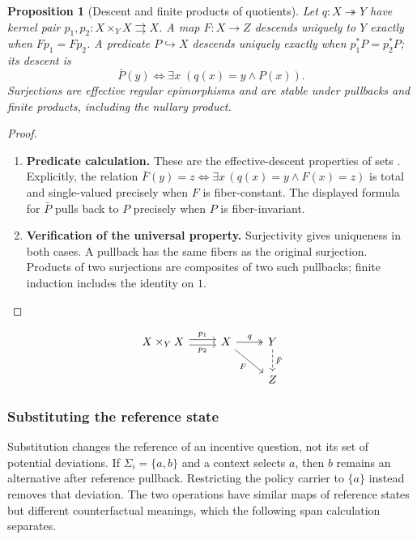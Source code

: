 \documentclass[11pt,a4paper]{article}
\numberwithin{equation}{section}
\newtheorem{proposition}[theorem]{Proposition}
\theoremstyle{definition}
\theoremstyle{remark}
\theoremstyle{plain}
\begin{document}
\begin{proposition}[Descent and finite products of quotients]
\label{prop:egt-kernel-descent}
\label{prop:egt-predicate-descent}
\label{prop:egt-finite-surjections}
Let $q:X\twoheadrightarrow Y$ have kernel pair
$p_1,p_2:X\times_YX\rightrightarrows X$.
A map $F:X\to Z$ descends uniquely to $Y$ exactly when $Fp_1=Fp_2$.
A predicate $P\hookrightarrow X$ descends uniquely exactly when
$p_1^*P=p_2^*P$; its descent is
\[
 \bar P(y)\iff\exists x\;(q(x)=y\wedge P(x)).
\]
Surjections are effective regular epimorphisms and are stable under
pullbacks and finite products, including the nullary product.
\end{proposition}
\begin{proof}
\leavevmode
\begin{enumerate}[label=\textup{(\arabic*)},leftmargin=*,itemsep=4pt,topsep=3pt]
  \item \textbf{Predicate calculation.} These are the effective-descent properties of sets
\citep[Chapters 4--5]{Jacobs1999}. Explicitly, the relation
$\bar F(y)=z\iff\exists x\,(q(x)=y\wedge F(x)=z)$ is total and
single-valued precisely when $F$ is fiber-constant. The displayed formula
for $\bar P$ pulls back to $P$ precisely when $P$ is fiber-invariant.
  \item \textbf{Verification of the universal property.} Surjectivity gives uniqueness in both cases. A pullback has the same fibers
as the original surjection. Products of two surjections are composites of
two such pullbacks; finite induction includes the identity on $1$.
\end{enumerate}
\end{proof}

\[
\begin{tikzcd}
 X\times_YX \arrow[r,shift left=.55ex,"p_1"]
 \arrow[r,shift right=.55ex,"p_2"'] &X\arrow[r,two heads,"q"]
 \arrow[dr,"F"'] &Y\arrow[d,dashed,"\bar F"]\\
 &&Z
\end{tikzcd}
\]

\subsubsection{Substituting the reference state}

Substitution changes the reference of an incentive question, not its
set of potential deviations. If $\Sigma_i=\{a,b\}$ and a context selects
$a$, then $b$ remains an alternative after reference pullback.
Restricting the policy carrier to $\{a\}$ instead removes that deviation.
The two operations have similar maps of reference states but different
counterfactual meanings, which the following span calculation separates.
\end{document}
